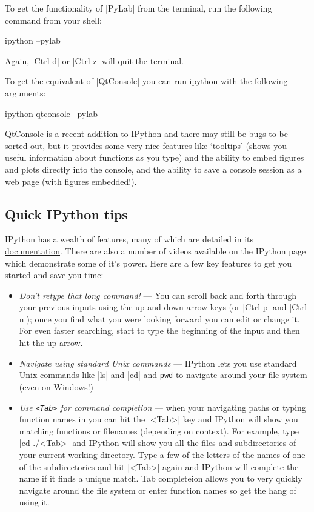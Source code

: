To get the functionality of |PyLab| from the terminal, run the
following command from your shell:
%
\begin{bash}
ipython --pylab
\end{bash}
%
Again, |Ctrl-d| or |Ctrl-z| will quit the terminal.

To get the equivalent of |QtConsole| you can run ipython with
the following arguments:
%
\begin{bash}
ipython qtconsole --pylab
\end{bash}
%
QtConsole is a recent addition to IPython and there may still be bugs to
be sorted out, but it provides some very nice features like `tooltips'
(shows you useful information about functions as you type) and the
ability to embed figures and plots directly into the console, and the
ability to save a console session as a web page (with figures
embedded!).

\subsection{Quick IPython tips}

IPython has a wealth of features, many of which are detailed in its
\href{http://ipython.org/documentation.html}{documentation}. There are
also a number of videos available on the IPython page which demonstrate
some of it's power. Here are a few key features to get you started and
save you time:

\begin{itemize}
\item
  \emph{Don't retype that long command!} --- You can scroll back and
  forth through your previous inputs using the up and down arrow keys
  (or |Ctrl-p| and |Ctrl-n|); once you find what you
  were looking forward you can edit or change it. For even faster
  searching, start to type the beginning of the input and then hit the
  up arrow.
\item
  \emph{Navigate using standard Unix commands} --- IPython lets you use
  standard Unix commands like |ls| and |cd| and
  \lstinline!pwd! to navigate around your file system (even on Windows!)
\item
  \emph{Use \texttt{<Tab>} for command completion} ---
  when your navigating paths or typing function names in you can hit the
  |<Tab>| key and IPython will show you matching functions or
  filenames (depending on context). For example, type
  |cd ./<Tab>| and IPython will show you all the files and
  subdirectories of your current working directory. Type a few of the
  letters of the names of one of the subdirectories and hit
  |<Tab>| again and IPython will complete the name if it finds
  a unique match. Tab completeion allows you to very quickly navigate
  around the file system or enter function names so get the hang of
  using it.
\end{itemize}


